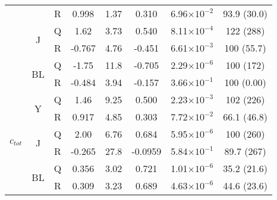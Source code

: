 \begin{table}[htb!]
\begin{tabular}{|ccc|ccccc|}
        & & R & 0.998 & 1.37 & 0.310 & 6.96$\times 10^{-2}$ & 93.9 (30.0) \\
        \cline{2-8}
        & \multirow{2}{*}{J} & Q & 1.62 & 3.73 & 0.540 & 8.11$\times 10^{-4}$ & 122 (288) \\
        & & R & -0.767 & 4.76 & -0.451 & 6.61$\times 10^{-3}$ & 100 (55.7) \\
        \cline{2-8}
        & \multirow{2}{*}{BL} & Q & -1.75 & 11.8 & -0.705 & 2.29$\times 10^{-6}$ & 100 (172) \\
        & & R & -0.484 & 3.94 & -0.157 & 3.66$\times 10^{-1}$ & 100 (0.00) \\
        \hline
        \multirow{6}{*}{$c_{tot}$} & \multirow{2}{*}{Y} & Q & 1.46 & 9.25 & 0.500 & 2.23$\times 10^{-3}$ & 102 (226) \\
        & & R & 0.917 & 4.85 & 0.303 & 7.72$\times 10^{-2}$ & 66.1 (46.8) \\
        \cline{2-8}
        & \multirow{2}{*}{J} & Q & 2.00 & 6.76 & 0.684 & 5.95$\times 10^{-6}$ & 100 (260) \\
        & & R & -0.265 & 27.8 & -0.0959 & 5.84$\times 10^{-1}$ & 89.7 (267) \\
        \cline{2-8}
        & \multirow{2}{*}{BL} & Q & 0.356 & 3.02 & 0.721 & 1.01$\times 10^{-6}$ & 35.2 (21.6) \\
        & & R & 0.309 & 3.23 & 0.689 & 4.63$\times 10^{-6}$ & 44.6 (23.6) \\
        \hline
    \end{tabular}
    \label{tb:phantomparamsfull}
\end{table}
\FloatBarrier
%
%


